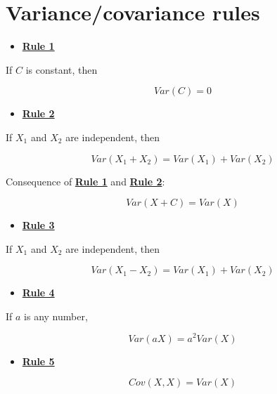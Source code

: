 \documentclass[
]{book}
\providecommand{\tightlist}{%
  \setlength{\itemsep}{0pt}\setlength{\parskip}{0pt}}
\begin{document}
\hypertarget{appendix-rules}{%
\chapter{Variance/covariance rules}\label{appendix-rules}}

\begin{itemize}
\tightlist
\item
  \href{./variance.html\#Rule1}{\textbf{Rule 1}}
\end{itemize}

If \(C\) is constant, then

\[
Var\left(C\right) = 0
\]

\begin{itemize}
\tightlist
\item
  \href{./variance.html\#Rule2}{\textbf{Rule 2}}
\end{itemize}

If \(X_{1}\) and \(X_{2}\) are independent, then

\[
Var\left(X_{1} + X_{2}\right) =
Var\left(X_{1}\right) + Var\left(X_{2}\right)
\]

Consequence of \href{./variance.html\#Rule1}{\textbf{Rule 1}} and \href{./variance.html\#Rule2}{\textbf{Rule 2}}:

\[
Var\left(X + C\right) = Var\left(X\right)
\]

\begin{itemize}
\tightlist
\item
  \href{./variance.html\#Rule3}{\textbf{Rule 3}}
\end{itemize}

If \(X_{1}\) and \(X_{2}\) are independent, then

\[
Var\left(X_{1} - X_{2}\right) =
Var\left(X_{1}\right) + Var\left(X_{2}\right)
\]

\begin{itemize}
\tightlist
\item
  \href{./variance.html\#Rule4}{\textbf{Rule 4}}
\end{itemize}

If \(a\) is any number,

\[
Var\left(aX\right) = a^2 Var\left(X\right)
\]

\begin{itemize}
\tightlist
\item
  \href{./covariance.html\#Rule5}{\textbf{Rule 5}}
\end{itemize}

\[
Cov(X, X) = Var(X)
\]
\end{document}
